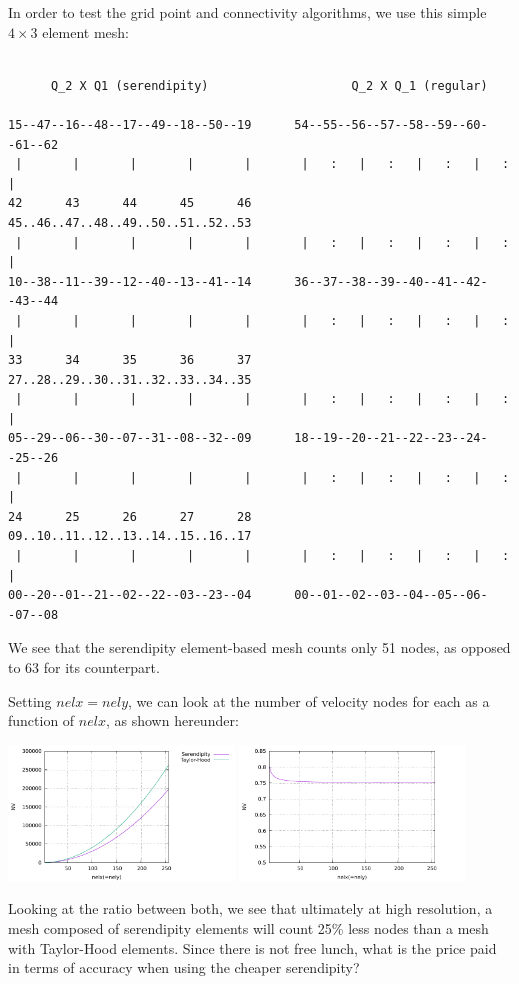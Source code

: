 In order to test the grid point and connectivity algorithms, 
we use this simple $4\times 3$ element mesh:

\begin{verbatim}

      Q_2 X Q1 (serendipity)                    Q_2 X Q_1 (regular)

15--47--16--48--17--49--18--50--19      54--55--56--57--58--59--60--61--62
 |       |       |       |       |       |   :   |   :   |   :   |   :   |
42      43      44      45      46      45..46..47..48..49..50..51..52..53
 |       |       |       |       |       |   :   |   :   |   :   |   :   |
10--38--11--39--12--40--13--41--14      36--37--38--39--40--41--42--43--44
 |       |       |       |       |       |   :   |   :   |   :   |   :   |
33      34      35      36      37      27..28..29..30..31..32..33..34..35
 |       |       |       |       |       |   :   |   :   |   :   |   :   |
05--29--06--30--07--31--08--32--09      18--19--20--21--22--23--24--25--26
 |       |       |       |       |       |   :   |   :   |   :   |   :   |
24      25      26      27      28      09..10..11..12..13..14..15..16..17
 |       |       |       |       |       |   :   |   :   |   :   |   :   |
00--20--01--21--02--22--03--23--04      00--01--02--03--04--05--06--07--08
\end{verbatim}

We see that the serendipity element-based mesh counts only 51 nodes, as
opposed to 63 for its counterpart.

Setting $nelx=nely$, we can look at the number of velocity nodes for each 
as a function of $nelx$, as shown hereunder:

\begin{center}
\includegraphics[width=6cm]{python_codes/fieldstone_52/NV.pdf}
\includegraphics[width=6cm]{python_codes/fieldstone_52/NV_ratio.pdf}
\end{center}
Looking at the ratio between both, we see that ultimately 
at high resolution, a mesh composed of serendipity elements 
will count 25\% less nodes than a mesh with Taylor-Hood elements.
Since there is not free lunch, what is the price paid in terms of accuracy when using 
the cheaper serendipity? 


